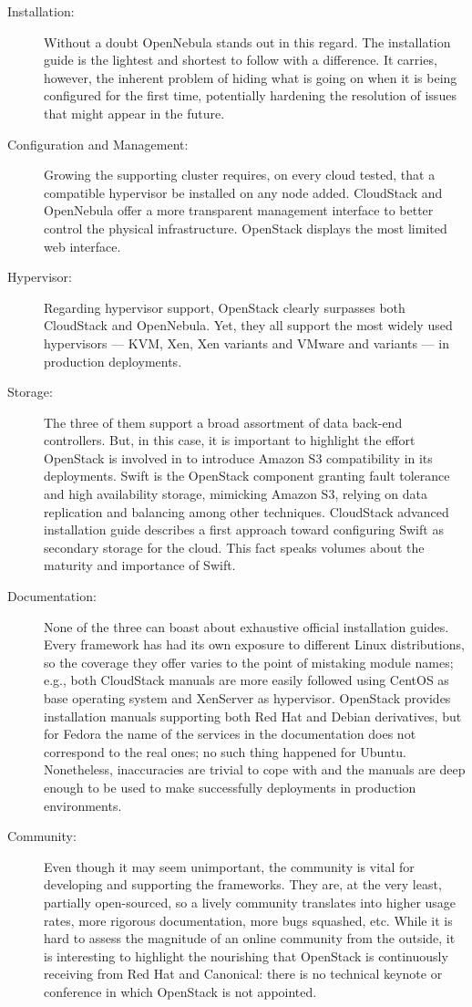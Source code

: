 \begin{description}
 \item[Installation:] Without a doubt OpenNebula stands out in this regard. The installation guide is the lightest and shortest to follow with a difference. It carries, however, the inherent problem of hiding what is going on when it is being configured for the first time, potentially hardening the resolution of issues that might appear in the future.
 \item[Configuration and Management:] Growing the supporting cluster requires, on every cloud tested, that a compatible hypervisor be installed on any node added. CloudStack and OpenNebula offer a more transparent management interface to better control the physical infrastructure. OpenStack displays the most limited web interface.
 \item[Hypervisor:] Regarding hypervisor support, OpenStack clearly surpasses both CloudStack and OpenNebula. Yet, they all support the most widely used hypervisors --- KVM, Xen, Xen variants and VMware and variants --- in production deployments.
 \item[Storage:] The three of them support a broad assortment of data back-end controllers. But, in this case, it is important to highlight the effort OpenStack is involved in to introduce Amazon S3 compatibility in its deployments. Swift is the OpenStack component granting fault tolerance and high availability storage, mimicking Amazon S3, relying on data replication and balancing among other techniques. CloudStack advanced installation guide \cite{cloudstackadvinstall} describes a first approach toward configuring Swift as secondary storage for the cloud. This fact speaks volumes about the maturity and importance of Swift.
 \item[Documentation:] None of the three can boast about exhaustive official installation guides. Every framework has had its own exposure to different Linux distributions, so the coverage they offer varies to the point of mistaking module names; e.g., both CloudStack manuals are more easily followed using CentOS as base operating system and XenServer as hypervisor. OpenStack provides installation manuals supporting both Red Hat and Debian derivatives, but for Fedora the name of the services in the documentation does not correspond to the real ones; no such thing happened for Ubuntu. Nonetheless, inaccuracies are trivial to cope with and the manuals are deep enough to be used to make successfully deployments in production environments.
 \item[Community:] Even though it may seem unimportant, the community is vital for developing and supporting the frameworks. They are, at the very least, partially open-sourced, so a lively community translates into higher usage rates, more rigorous documentation, more bugs squashed, etc. While it is hard to assess the magnitude of an online community from the outside, it is interesting to highlight the nourishing that OpenStack is continuously receiving from Red Hat and Canonical: there is no technical keynote or conference in which OpenStack is not appointed.
\end{description} 

